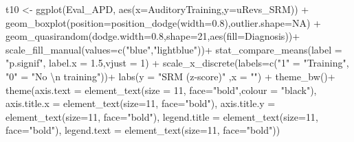 \documentclass[a4paper, twoside]{templates/ociamthesis}
\newenvironment{Shaded}{\begin{snugshade}}{\end{snugshade}}
\newcommand{\AttributeTok}[1]{\textcolor[rgb]{0.77,0.63,0.00}{#1}}
\newcommand{\ConstantTok}[1]{\textcolor[rgb]{0.00,0.00,0.00}{#1}}
\newcommand{\DecValTok}[1]{\textcolor[rgb]{0.00,0.00,0.81}{#1}}
\newcommand{\FloatTok}[1]{\textcolor[rgb]{0.00,0.00,0.81}{#1}}
\newcommand{\FunctionTok}[1]{\textcolor[rgb]{0.00,0.00,0.00}{#1}}
\newcommand{\NormalTok}[1]{#1}
\newcommand{\OtherTok}[1]{\textcolor[rgb]{0.56,0.35,0.01}{#1}}
\newcommand{\SpecialCharTok}[1]{\textcolor[rgb]{0.00,0.00,0.00}{#1}}
\newcommand{\StringTok}[1]{\textcolor[rgb]{0.31,0.60,0.02}{#1}}
\renewenvironment{Shaded}
{
  \vspace{4pt}%
  \begin{snugshade}%
}{%
  \end{snugshade}%
  \vspace{4pt}%
}
\begin{document}
\begin{Shaded}
\begin{Highlighting}[]
\NormalTok{t10 }\OtherTok{\textless{}{-}} \FunctionTok{ggplot}\NormalTok{(Eval\_APD, }\FunctionTok{aes}\NormalTok{(}\AttributeTok{x=}\NormalTok{AuditoryTraining,}\AttributeTok{y=}\NormalTok{uRevs\_SRM)) }\SpecialCharTok{+}
    \FunctionTok{geom\_boxplot}\NormalTok{(}\AttributeTok{position=}\FunctionTok{position\_dodge}\NormalTok{(}\AttributeTok{width=}\FloatTok{0.8}\NormalTok{),}\AttributeTok{outlier.shape=}\ConstantTok{NA}\NormalTok{) }\SpecialCharTok{+} 
  \FunctionTok{geom\_quasirandom}\NormalTok{(}\AttributeTok{dodge.width=}\FloatTok{0.8}\NormalTok{,}\AttributeTok{shape=}\DecValTok{21}\NormalTok{,}\FunctionTok{aes}\NormalTok{(}\AttributeTok{fill=}\NormalTok{Diagnosis))}\SpecialCharTok{+}
  \FunctionTok{scale\_fill\_manual}\NormalTok{(}\AttributeTok{values=}\FunctionTok{c}\NormalTok{(}\StringTok{"blue"}\NormalTok{,}\StringTok{"lightblue"}\NormalTok{))}\SpecialCharTok{+}
  \FunctionTok{stat\_compare\_means}\NormalTok{(}\AttributeTok{label =}  \StringTok{"p.signif"}\NormalTok{, }\AttributeTok{label.x =} \FloatTok{1.5}\NormalTok{,}\AttributeTok{vjust =} \DecValTok{1}\NormalTok{) }\SpecialCharTok{+}
  \FunctionTok{scale\_x\_discrete}\NormalTok{(}\AttributeTok{labels=}\FunctionTok{c}\NormalTok{(}\StringTok{"1"} \OtherTok{=} \StringTok{"Training"}\NormalTok{, }\StringTok{"0"} \OtherTok{=} \StringTok{"No }\SpecialCharTok{\textbackslash{}n}\StringTok{ training"}\NormalTok{))}\SpecialCharTok{+}
  \FunctionTok{labs}\NormalTok{(}\AttributeTok{y =} \StringTok{"SRM (z{-}score)"}\NormalTok{ ,}\AttributeTok{x =} \StringTok{""}\NormalTok{) }\SpecialCharTok{+}
  \FunctionTok{theme\_bw}\NormalTok{()}\SpecialCharTok{+}
  \FunctionTok{theme}\NormalTok{(}\AttributeTok{axis.text =} \FunctionTok{element\_text}\NormalTok{(}\AttributeTok{size =} \DecValTok{11}\NormalTok{, }\AttributeTok{face=}\StringTok{"bold"}\NormalTok{,}\AttributeTok{colour =} \StringTok{"black"}\NormalTok{),}
        \AttributeTok{axis.title.x =} \FunctionTok{element\_text}\NormalTok{(}\AttributeTok{size=}\DecValTok{11}\NormalTok{, }\AttributeTok{face=}\StringTok{"bold"}\NormalTok{),}
        \AttributeTok{axis.title.y =} \FunctionTok{element\_text}\NormalTok{(}\AttributeTok{size=}\DecValTok{11}\NormalTok{, }\AttributeTok{face=}\StringTok{"bold"}\NormalTok{),}
        \AttributeTok{legend.title =} \FunctionTok{element\_text}\NormalTok{(}\AttributeTok{size=}\DecValTok{11}\NormalTok{, }\AttributeTok{face=}\StringTok{"bold"}\NormalTok{),}
        \AttributeTok{legend.text  =} \FunctionTok{element\_text}\NormalTok{(}\AttributeTok{size=}\DecValTok{11}\NormalTok{, }\AttributeTok{face=}\StringTok{"bold"}\NormalTok{))}


\end{Highlighting}
\end{Shaded}
\end{document}
